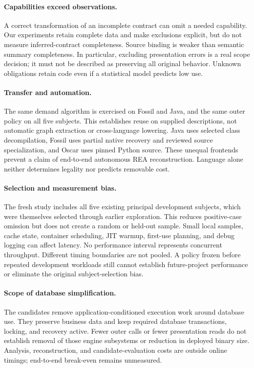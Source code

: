 \documentclass[acmsmall,screen,review,anonymous]{acmart}
\begin{document}
\paragraph{Capabilities exceed observations.}
A correct transformation of an incomplete contract can omit a needed capability.
Our experiments retain complete data and make exclusions explicit, but do not
measure inferred-contract completeness. Source binding is weaker than semantic
summary completeness. In particular, excluding presentation errors is a real
scope decision; it must not be described as preserving all original behavior.
Unknown obligations retain code even if a statistical model predicts low use.

\paragraph{Transfer and automation.}
The same demand algorithm is exercised on Fossil and Java, and the same outer
policy on all five subjects. This establishes reuse on supplied descriptions,
not automatic graph extraction or cross-language lowering. Java uses selected
class decompilation, Fossil uses partial native recovery and reviewed source
specialization, and Oscar uses pinned Python source. These unequal frontends
prevent a claim of end-to-end autonomous REA reconstruction. Language alone
neither determines legality nor predicts removable cost.

\paragraph{Selection and measurement bias.}
The fresh study includes all five existing principal development subjects,
which were themselves selected through earlier exploration. This reduces
positive-case omission but does not create a random or held-out sample. Small local samples,
cache state, container scheduling, JIT warmup, first-use planning, and debug
logging can affect latency. No performance interval represents concurrent
throughput. Different timing boundaries are not pooled. A policy frozen before repeated development workloads still cannot establish
future-project performance or eliminate the original subject-selection bias.

\paragraph{Scope of database simplification.}
The candidates remove application-conditioned execution work around database
use. They preserve business data and keep required database transactions,
locking, and recovery active. Fewer outer calls or fewer presentation reads
do not establish removal of those engine subsystems or reduction in deployed
binary size. Analysis, reconstruction, and candidate-evaluation costs are
outside online timings; end-to-end break-even remains unmeasured.
\end{document}
